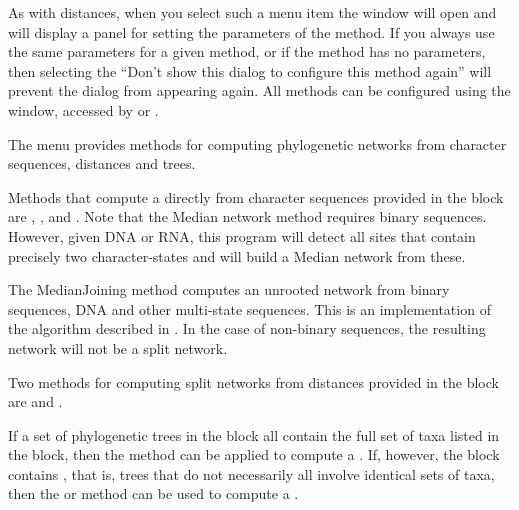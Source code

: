 \documentclass[11pt]{article}
\begin{document}
As with distances,
when you select such a menu item the  window will open
and will display a panel for setting the parameters of the method.
If you always use the same parameters for a given method, or if the method
has no parameters, then
selecting the ``Don't show this dialog to configure this method again''
will prevent the  dialog from appearing again.
All methods can be configured using the  window, accessed by
 or
.


The  menu provides methods for computing phylogenetic
networks from character sequences, distances and trees.

Methods that compute a  directly from character sequences
provided in the  block
are ,  , 
and
.
Note that the Median network method requires binary sequences.
However, given DNA or RNA, this program will detect all sites that contain
precisely two character-states and will build a Median network from these.

The MedianJoining method computes an unrooted network from
binary sequences, DNA and other multi-state sequences.
This is an implementation of the algorithm described
in \cite{Bandelt1999}.
In the case of non-binary sequences, the resulting network will not
be a split network.

Two methods for computing split networks from distances provided
in the  block are
 and .

If a set of phylogenetic trees in the  block
all contain the full set of taxa listed in the  block,
then the  method can be applied
to compute a .
If, however, the  block contains , that is,
trees that do not necessarily all involve identical sets of taxa,
then the  or 
method can be used to compute a .

\end{document}
